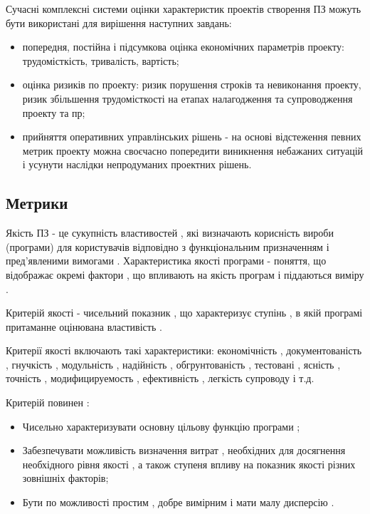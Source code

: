 \documentclass[oneside,final,14pt]{extreport}
\begin{document}
Сучасні комплексні системи оцінки характеристик проектів створення ПЗ можуть бути використані для вирішення наступних завдань:
\begin{itemize}
\item {} 
попередня, постійна і підсумкова оцінка економічних параметрів проекту: трудомісткість, тривалість, вартість;

\item {} 
оцінка ризиків по проекту: ризик порушення строків та невиконання проекту, ризик збільшення трудомісткості на етапах налагодження та супроводження проекту та пр;

\item {} 
прийняття оперативних управлінських рішень - на основі відстеження певних метрик проекту можна своєчасно попередити виникнення небажаних ситуацій і усунути наслідки непродуманих проектних рішень.

\end{itemize}


\subsection{Метрики}
\label{2section:id3}
Якість ПЗ - це сукупність властивостей , які визначають корисність вироби (програми) для користувачів відповідно з функціональним призначенням і пред'явленими вимогами .
Характеристика якості програми - поняття, що відображає окремі фактори , що впливають на якість програм і піддаються виміру .

Критерій якості - чисельний показник , що характеризує ступінь , в якій програмі притаманне оцінювана властивість .

Критерії якості включають такі характеристики: економічність , документованість , гнучкість , модульність , надійність , обгрунтованість , тестовані , ясність , точність , модифицируемость , ефективність , легкість супроводу і т.д.

Критерій повинен :
\begin{itemize}
\item {} 
Чисельно характеризувати основну цільову функцію програми ;

\item {} 
Забезпечувати можливість визначення витрат , необхідних для досягнення необхідного рівня якості , а також ступеня впливу на показник якості різних зовнішніх факторів;

\item {} 
Бути по можливості простим , добре вимірним і мати малу дисперсію .

\end{itemize}
\end{document}
